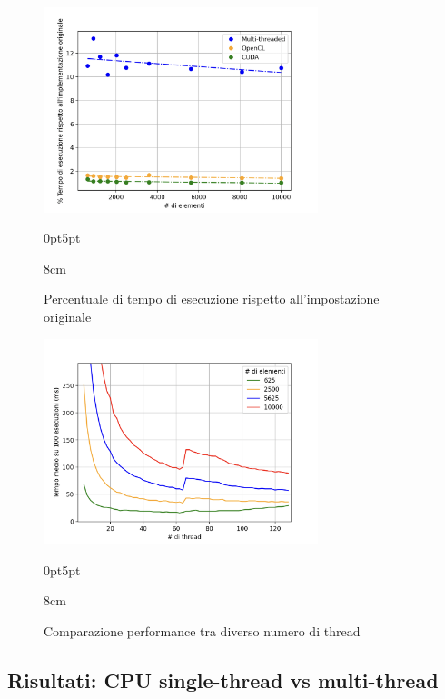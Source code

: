 \begin{figure}[!ht]
  \begin{minipage}[t]{0.5\linewidth}
    \centering
    \includegraphics[width=8cm]{images/results/gain-perc-better.png}
    \begin{adjustwidth}
      {0pt}{5pt}
      \begin{varwidth}
        {8cm}
        \caption{Percentuale di tempo di esecuzione rispetto all'impostazione
        originale}
        \label{fig:perc-better}
      \end{varwidth}
    \end{adjustwidth}
  \end{minipage}
  \begin{minipage}[t]{0.5\linewidth}
    \centering
    \includegraphics[width=8cm]{images/results/gain-comp-threads.png}
    \begin{adjustwidth}
      {0pt}{5pt}
      \begin{varwidth}
        {8cm}
        \caption{Comparazione performance tra diverso numero di thread}
        \label{fig:risultati-cpu}
      \end{varwidth}
    \end{adjustwidth}
  \end{minipage}
\end{figure}

\subsection{Risultati: CPU single-thread vs multi-thread}
\label{subsec:risultati-cpu}

